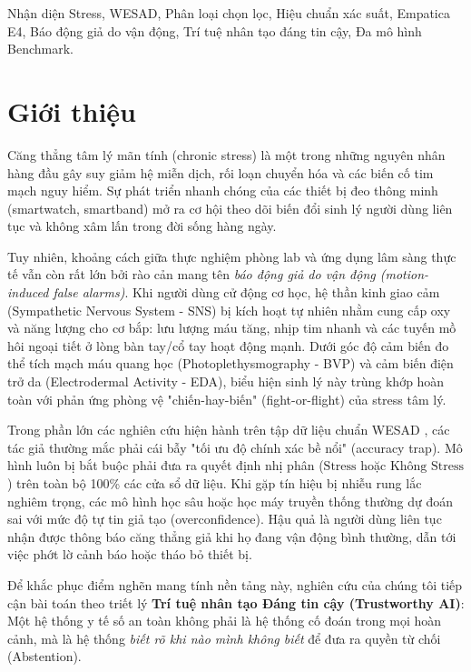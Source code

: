 \documentclass[conference]{IEEEtran}
\begin{document}
\begin{IEEEkeywords}
Nhận diện Stress, WESAD, Phân loại chọn lọc, Hiệu chuẩn xác suất, Empatica E4, Báo động giả do vận động, Trí tuệ nhân tạo đáng tin cậy, Đa mô hình Benchmark.
\end{IEEEkeywords}

\section{Giới thiệu}
Căng thẳng tâm lý mãn tính (chronic stress) là một trong những nguyên nhân hàng đầu gây suy giảm hệ miễn dịch, rối loạn chuyển hóa và các biến cố tim mạch nguy hiểm. Sự phát triển nhanh chóng của các thiết bị đeo thông minh (smartwatch, smartband) mở ra cơ hội theo dõi biến đổi sinh lý người dùng liên tục và không xâm lấn trong đời sống hàng ngày.

Tuy nhiên, khoảng cách giữa thực nghiệm phòng lab và ứng dụng lâm sàng thực tế vẫn còn rất lớn bởi rào cản mang tên \textit{báo động giả do vận động (motion-induced false alarms)}. Khi người dùng cử động cơ học, hệ thần kinh giao cảm (Sympathetic Nervous System - SNS) bị kích hoạt tự nhiên nhằm cung cấp oxy và năng lượng cho cơ bắp: lưu lượng máu tăng, nhịp tim nhanh và các tuyến mồ hôi ngoại tiết ở lòng bàn tay/cổ tay hoạt động mạnh. Dưới góc độ cảm biến đo thể tích mạch máu quang học (Photoplethysmography - BVP) và cảm biến điện trở da (Electrodermal Activity - EDA), biểu hiện sinh lý này trùng khớp hoàn toàn với phản ứng phòng vệ "chiến-hay-biến" (fight-or-flight) của stress tâm lý. 

Trong phần lớn các nghiên cứu hiện hành trên tập dữ liệu chuẩn WESAD \cite{schmidt2018wesad, bobade2020stress}, các tác giả thường mắc phải cái bẫy "tối ưu độ chính xác bề nổi" (accuracy trap). Mô hình luôn bị bắt buộc phải đưa ra quyết định nhị phân ($\text{Stress}$ hoặc $\text{Không Stress}$) trên toàn bộ 100\% các cửa sổ dữ liệu. Khi gặp tín hiệu bị nhiễu rung lắc nghiêm trọng, các mô hình học sâu hoặc học máy truyền thống thường dự đoán sai với mức độ tự tin giả tạo (overconfidence). Hậu quả là người dùng liên tục nhận được thông báo căng thẳng giả khi họ đang vận động bình thường, dẫn tới việc phớt lờ cảnh báo hoặc tháo bỏ thiết bị.

Để khắc phục điểm nghẽn mang tính nền tảng này, nghiên cứu của chúng tôi tiếp cận bài toán theo triết lý \textbf{Trí tuệ nhân tạo Đáng tin cậy (Trustworthy AI)}: Một hệ thống y tế số an toàn không phải là hệ thống cố đoán trong mọi hoàn cảnh, mà là hệ thống \textit{biết rõ khi nào mình không biết} để đưa ra quyền từ chối (Abstention). 
\end{document}
